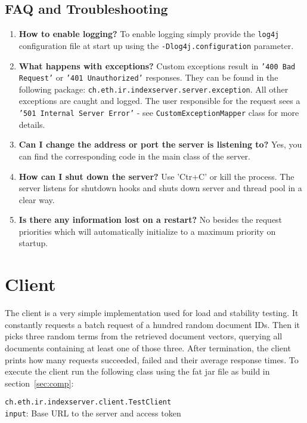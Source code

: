\documentclass[a4paper,11pt]{article}
\begin{document}
\subsection{FAQ and Troubleshooting}
\begin{enumerate}
\item \textbf{How to enable logging?} To enable logging simply provide the \texttt{log4j} configuration file at start up using the \texttt{-Dlog4j.configuration} parameter.

\item \textbf{What happens with exceptions?} Custom exceptions result in \texttt{'400 Bad Request'} or \texttt{'401 Unauthorized'} responses. They can be found in the following package: \texttt{ch.eth.ir.indexserver.server.exception}. All other exceptions are caught and logged. The user responsible for the request sees a \texttt{'501 Internal Server Error'} - see \texttt{CustomExceptionMapper} class for more details.

\item \textbf{Can I change the address or port the server is listening to?} Yes, you can find the corresponding code in the main class of the server.

\item \textbf{How can I shut down the server?} Use 'Ctr+C' or kill the process. The server listens for shutdown hooks and shuts down server and thread pool in a clear way. 

\item \textbf{Is there any information lost on a restart?} No besides the request priorities which will automatically initialize to a maximum priority on startup.

\end{enumerate}

\section{Client}
The client is a very simple implementation used for load and stability testing. It constantly requests a batch request of a hundred random document IDs. Then it picks three random terms from the retrieved document vectors, querying all documents containing at least one of those three. After termination, the client prints how many requests succeeded, failed and their average response times. To execute the client run the following class using the fat jar file as build in section~\ref{sec:comp}:
\begin{leftbar}
\texttt{ch.eth.ir.indexserver.client.TestClient}\\
\texttt{input}: Base URL to the server and access token
\end{leftbar}
\end{document}
